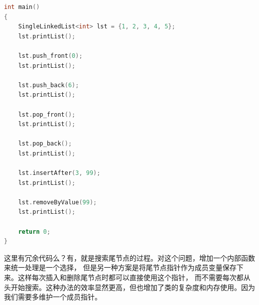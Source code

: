 \documentclass[a4paper]{ctexart}
\theoremstyle{definition}
\theoremstyle{definition}
\begin{document}
\begin{lstlisting}[language=c++]
int main()
{
    SingleLinkedList<int> lst = {1, 2, 3, 4, 5};
    lst.printList();

    lst.push_front(0);
    lst.printList();

    lst.push_back(6);
    lst.printList();

    lst.pop_front();
    lst.printList();

    lst.pop_back();
    lst.printList();

    lst.insertAfter(3, 99);
    lst.printList();

    lst.removeByValue(99);
    lst.printList();

    return 0;
}

\end{lstlisting}

这里有冗余代码么？有，就是搜索尾节点的过程。对这个问题，增加一个内部函数来统一处理是一个选择，
但是另一种方案是将尾节点指针作为成员变量保存下来。这样每次插入和删除尾节点时都可以直接使用这个指针，
而不需要每次都从头开始搜索。这种办法的效率显然更高，但也增加了类的复杂度和内存使用。因为我们需要多维护一个成员指针。





\end{document}
